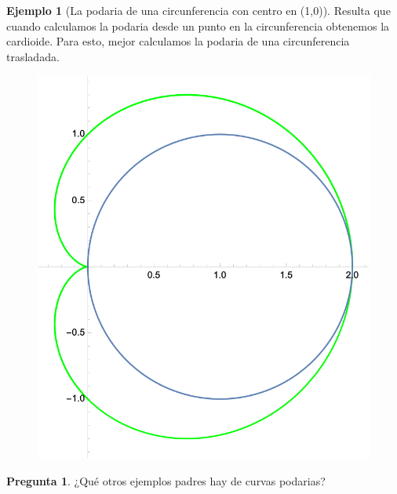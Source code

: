 \documentclass[spanish]{book}
\theoremstyle{definition}
\newtheorem*{ejem}{Ejemplo}
\newtheorem*{pregunta}{Pregunta}
\begin{document}
\begin{ejem}[La podaria de una circunferencia con centro en (1,0)]
	Resulta que cuando calculamos la podaria desde un punto en la circunferencia obtenemos la cardioide. Para esto, mejor calculamos la podaria de una circunferencia trasladada.
	\begin{figure}[H]
		\centering
		\includegraphics[width=0.7\linewidth]{curvas9}
	\end{figure}
\end{ejem}
\begin{pregunta}
	¿Qué otros ejemplos padres hay de curvas podarias?
\end{pregunta}
\end{document}
